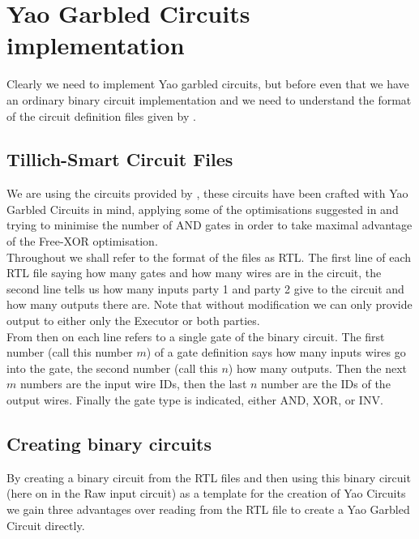 \documentclass[ %
                    author={Nicholas Tutte},
                supervisor={Prof. Nigel Smart},
                    degree={MEng},
                     title={Secure Two Party Computation},
                  subtitle={A practical comparison of recent protocols},
                      type={Research - GG1K},
                      year={2015} ]{dissertation}
\begin{document}
		\section{Yao Garbled Circuits implementation}

			Clearly we need to implement Yao garbled circuits, but before even that we have an ordinary binary circuit implementation and we need to understand the format of the circuit definition files given by \cite{NigelCircuits}.

			\subsection{Tillich-Smart Circuit Files}

				We are using the circuits provided by \cite{NigelCircuits}, these circuits have been crafted with Yao Garbled Circuits in mind, applying some of the optimisations suggested in \cite{SMC_Is_Practical} and trying to minimise the number of AND gates in order to take maximal advantage of the Free-XOR optimisation.\\

				Throughout we shall refer to the format of the files as RTL. The first line of each RTL file saying how many gates and how many wires are in the circuit, the second line tells us how many inputs party 1 and party 2 give to the circuit and how many outputs there are. Note that without modification we can only provide output to either only the Executor or both parties.\\

				From then on each line refers to a single gate of the binary circuit. The first number (call this number $m$) of a gate definition says how many inputs wires go into the gate, the second number (call this $n$) how many outputs. Then the next $m$ numbers are the input wire IDs, then the last $n$ number are the IDs of the output wires. Finally the gate type is indicated, either AND, XOR, or INV.\\

			\subsection{Creating binary circuits}
				By creating a binary circuit from the RTL files and then using this binary circuit (here on in the Raw input circuit) as a template for the creation of Yao Circuits we gain three advantages over reading from the RTL file to create a Yao Garbled Circuit directly.\\
\end{document}
